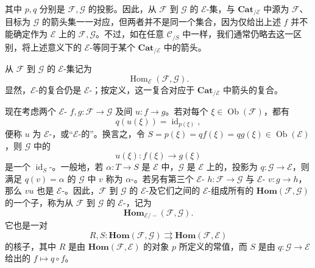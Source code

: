 其中 $p,q$ 分别是 $\mathcal F,\mathcal G$ 的投影。因此，从 $\mathcal F$ 到 $\mathcal G$ 的 $\mathcal E$-集，与 $\mathbf{Cat}_{/\mathcal E}$ 中源为 $\mathcal F$、目标为 $\mathcal G$ 的箭头集一一对应，但两者并不是同一个集合，因为仅给出上述 $f$ 并不能确定作为 $\mathcal E$ 上的 $\mathcal F,\mathcal G$。不过，如在任意 $\mathcal C_{/S}$ 中一样，我们通常仍略去这一区别，将上述意义下的 $\mathcal E$-等同于某个 $\mathbf{Cat}_{/\mathcal E}$ 中的箭头。

从 $\mathcal F$ 到 $\mathcal G$ 的 $\mathcal E$-集记为
\[
 \operatorname{Hom}_{\mathcal E}(\mathcal F,\mathcal G).
\]
显然，$\mathcal E$-的复合仍是 $\mathcal E$-；按定义，这一复合对应于 $\mathbf{Cat}_{/\mathcal E}$ 中箭头的复合。

现在考虑两个 $\mathcal E$- $f,g:\mathcal F\to\mathcal G$ 及间 $u:f\to g$。若对每个 $\xi\in\operatorname{Ob}(\mathcal F)$，都有
\[
 q(u(\xi))=\operatorname{id}_{p(\xi)},
\]
便称 $u$ 为 $\mathcal E$-，或“$\mathcal E$-的”。换言之，令 $S=p(\xi)=qf(\xi)=qg(\xi)\in\operatorname{Ob}(\mathcal E)$，则 $\mathcal G$ 中的
\[
 u(\xi):f(\xi)\longrightarrow g(\xi)
\]
是一个 $\operatorname{id}_S$-。一般地，若 $\alpha:T\to S$ 是 $\mathcal E$ 中，$\mathcal G$ 是 $\mathcal E$ 上的，投影为 $q:\mathcal G\to\mathcal E$，则满足 $q(v)=\alpha$ 的 $\mathcal G$ 中 $v$ 称为 $\alpha$-。若另有第三个 $\mathcal E$- $h:\mathcal F\to\mathcal G$ 与 $\mathcal E$- $v:g\to h$，那么 $vu$ 也是 $\mathcal E$-。因此，$\mathcal F$ 到 $\mathcal G$ 的 $\mathcal E$-及它们之间的 $\mathcal E$-组成所有的 $\mathbf{Hom}(\mathcal F,\mathcal G)$ 的一个子，称为从 $\mathcal F$ 到 $\mathcal G$ 的 $\mathcal E$-，记为
\[
 \mathbf{Hom}_{\mathcal E/-}(\mathcal F,\mathcal G).
\]
它也是一对
\[
 R,S:\mathbf{Hom}(\mathcal F,\mathcal G)\rightrightarrows
 \mathbf{Hom}(\mathcal F,\mathcal E)
\]
的核子，其中 $R$ 是由 $\mathbf{Hom}(\mathcal F,\mathcal E)$ 的对象 $p$ 所定义的常值，而 $S$ 是由 $q:\mathcal G\to\mathcal E$ 给出的 $f\mapsto q\circ f$。

